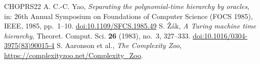 \begin{thebibliography}{CHOPRS22}
 A. C.-C. Yao, \emph{Separating the polynomial-time hierarchy by oracles}, in: 26th Annual Symposium on Foundations of Computer Science (FOCS 1985), IEEE, 1985, pp.~1--10. \href{https://doi.org/10.1109/SFCS.1985.49}{doi:10.1109/SFCS.1985.49}
 S. {\v Z}{\'a}k, \emph{A Turing machine time hierarchy}, Theoret. Comput. Sci. \textbf{26} (1983), no.~3, 327--333. \href{https://doi.org/10.1016/0304-3975(83)90015-4}{doi:10.1016/0304-3975(83)90015-4}
 S. Aaronson et al., \emph{The Complexity Zoo}, \url{https://complexityzoo.net/Complexity_Zoo}.
\end{thebibliography}
\endgroup
